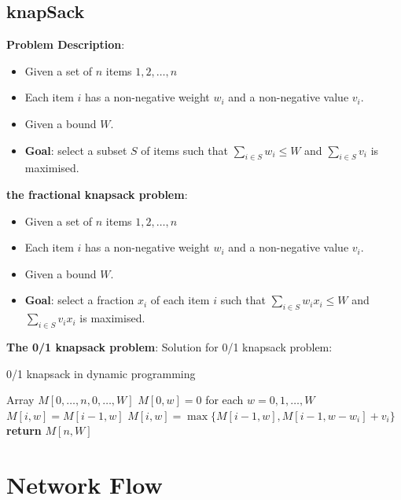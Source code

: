 \documentclass[onecolumn]{report}
\begin{document}
\section{knapSack}
\textbf{Problem Description}:
\begin{itemize}
    \item Given a set of $n$ items ${1,2,\dots,n}$
    \item Each item $i$ has a non-negative weight $w_i$ and a non-negative value $v_i$.
    \item Given a bound $W$.
    \item \textbf{Goal}: select a subset $S$ of items such that $\sum_{i\in S}w_i\leq W$ and $\sum_{i\in S}v_i$ is maximised.
\end{itemize}
\textbf{the fractional knapsack problem}:
\begin{itemize}
    \item Given a set of $n$ items ${1,2,\dots,n}$
    \item Each item $i$ has a non-negative weight $w_i$ and a non-negative value $v_i$.
    \item Given a bound $W$.
    \item \textbf{Goal}: select a fraction $x_i$ of each item $i$ such that $\sum_{i\in S}w_ix_i\leq W$ and $\sum_{i\in S}v_ix_i$ is maximised.
\end{itemize}
\textbf{The 0/1 knapsack problem}:
Solution for 0/1 knapsack problem:
\begin{algorithm}
\caption{0/1 knapsack in dynamic programming}
\begin{algorithmic}
        \State Array $M[0,\dots,n,0,\dots,W]$
        \State $M[0,w]=0$ for each $w=0,1,\dots,W$
                    \State $M[i,w]=M[i-1,w]$
                \Else
                    \State $M[i,w]=\max\{M[i-1,w],M[i-1,w-w_i]+v_i\}$
                \EndIf
            \EndFor
        \EndFor
        \State \textbf{return} $M[n,W]$
    \EndProcedure
\end{algorithmic}
\end{algorithm}

\chapter{Network Flow}
\end{document}
